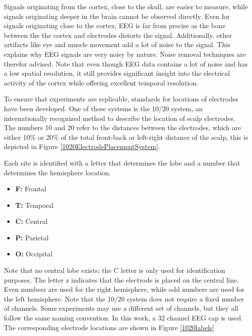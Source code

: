 
Signals originating from the cortex, close to the skull, are easier to measure, while signals originating deeper in the brain cannot be observed directly. Even for signals originating close to the cortex, EEG is far from precise as the bone between the the cortex and electrodes distorts the signal. Additionally, other artifacts like eye and muscle movement add a lot of noise to the signal. This explains why EEG signals are very noisy by nature. Noise removal techniques are therefor advised\citep{noiseRem}. Note that even though EEG data contains a lot of noise and has a low spatial resolution, it still provides significant insight into the electrical activity of the cortex while offering excellent temporal resolution\cite{GivenPaper}.

\npar

To ensure that experiments are replicable, standards for locations of electrodes have been developed. One of these systems is the 10/20 system, an internationally recognized method to describe the location of scalp electrodes\cite{TenTwentyManual}. The numbers 10 and 20 refer to the distances between the electrodes, which are either 10\% or 20\% of the total front-back or left-right distance of the scalp, this is depicted in Figure \ref{1020ElectrodePlacementSystem}. 


Each site is identified with a letter that determines the lobe and a number that determines the hemisphere location.
\begin{itemize}
\item \textbf{F:} Frontal
\item \textbf{T:} Temporal
\item \textbf{C:} Central
\item \textbf{P:} Parietal
\item \textbf{O:} Occipital
\end{itemize}
Note that no central lobe exists; the C letter is only used for identification purposes. The letter z indicates that the electrode is placed on the central line. Even numbers are used for the right hemisphere, while odd numbers are used for the left hemisphere. Note that the 10/20 system does not require a fixed number of channels. Some experiments may use a different set of channels, but they all follow the same naming convention. In this work, a 32 channel EEG cap is used. The corresponding electrode locations are shown in Figure \ref{1020labels}

